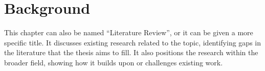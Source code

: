 \chapter{Background}
\label{ch:background}

This chapter can also be named ``Literature Review'',
or it can be given a more specific title.
It discusses existing research related to the topic,
identifying gaps in the literature that the thesis aims to fill.
It also positions the research within the broader field,
showing how it builds upon or challenges existing work.
